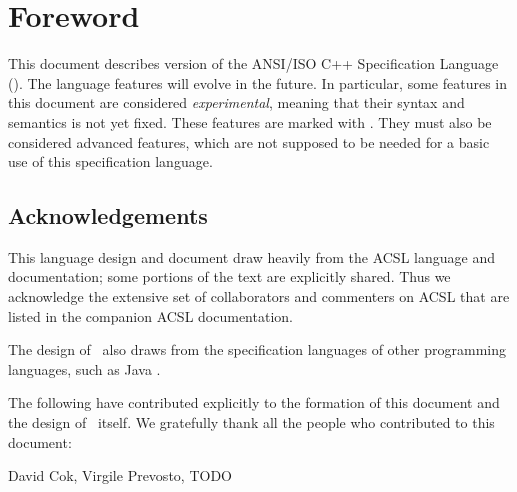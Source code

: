 \chapter*{Foreword}


This document describes version \version{} of the ANSI/ISO C++ Specification Language (\NAME). 
The language features will evolve in the future. 
In particular, some features in this document
are considered \emph{experimental}, meaning that their syntax and
semantics is not yet fixed.  
These features are marked with
\experimental.  
They must also be considered advanced features,
which are not supposed to be needed for a basic use of this
specification language.

\section*{Acknowledgements}

This language design and document draw heavily from the 
ACSL language and documentation; some portions of the text
are explicitly shared. Thus we acknowledge the extensive
set of collaborators and commenters on ACSL that are listed
in the companion ACSL documentation.

The design of \NAME~also draws from the specification
languages of other programming languages, such as Java \cite{leavens00jml}.

The following have contributed explicitly to the formation of
this document and the design of \NAME~itself.
We gratefully thank all the people who contributed to this document:

David Cok,
Virgile Prevosto,
TODO
